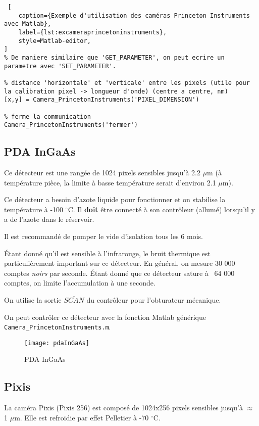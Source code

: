\documentclass[11pt,francais]{book} %
\begin{document}
\begin{lstlisting} [
    caption={Exemple d'utilisation des caméras Princeton Instruments avec Matlab},
    label={lst:excameraprincetoninstruments},
    style=Matlab-editor,
]
% De maniere similaire que 'GET_PARAMETER', on peut ecrire un parametre avec 'SET_PARAMETER'.

% distance 'horizontale' et 'verticale' entre les pixels (utile pour la calibration pixel -> longueur d'onde) (centre a centre, nm)
[x,y] = Camera_PrincetonInstruments('PIXEL_DIMENSION')

% ferme la communication
Camera_PrincetonInstruments('fermer')

\end{lstlisting}

\subsection{PDA InGaAs}

Ce détecteur est une rangée de 1024 pixels sensibles jusqu'à 2.2 $\mu$m (à température pièce, la limite à basse température serait d'environ 2.1 $\mu$m).

Ce détecteur a besoin d'azote liquide pour fonctionner et on stabilise la température à -100 $^{\circ}$C.
Il {\bf doit} être connecté à son contrôleur (allumé) lorsqu'il y a de l'azote dans le réservoir.

Il est recommandé de pomper le vide d'isolation tous les 6 mois.

Étant donné qu'il est sensible à l'infrarouge, le bruit thermique est particulièrement important sur ce détecteur.
En général, on mesure 30 000 comptes {\it noirs} par seconde.
Étant donné que ce détecteur sature à ~64 000 comptes, on limite l'accumulation à une seconde.

On utilise la sortie $\overline{SCAN}$ du contrôleur pour l'obturateur mécanique.

On peut contrôler ce détecteur avec la fonction Matlab générique \verb!Camera_PrincetonInstruments.m!.

\begin{figure}[htbp]
  \centering\texttt{[image: pdaInGaAs]}
  \caption{PDA InGaAs}
  \label{fig:pdaingaas}
\end{figure}

\subsection{Pixis}

La caméra Pixis (Pixis 256) est composé de 1024x256 pixels sensibles jusqu'à $\approx$ 1 $\mu$m.
Elle est refroidie par effet Pelletier à -70 $^{\circ}$C.
\end{document}
